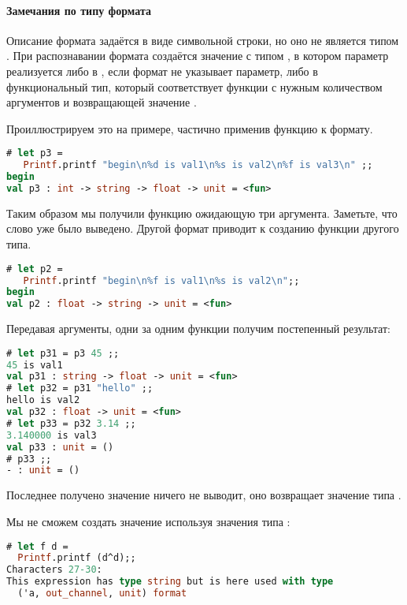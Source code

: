 \paragraph{Замечания по типу формата}

Описание формата задаётся в виде символьной строки, но оно не является типом 
. При распознавании формата создаётся значение с типом 
, в котором параметр  реализуется либо в , 
если формат не указывает параметр, либо в функциональный тип, который 
соответствует функции с нужным количеством аргументов и возвращающей значение 
.

Проиллюстрируем это на примере, частично применив функцию к формату.

\begin{lstlisting}[language=OCaml]
# let p3 = 
   Printf.printf "begin\n%d is val1\n%s is val2\n%f is val3\n" ;;
begin
val p3 : int -> string -> float -> unit = <fun>
\end{lstlisting}

Таким образом мы получили функцию ожидающую три аргумента. Заметьте, что слово 
 уже было выведено. Другой формат приводит к созданию функции 
другого типа.

\begin{lstlisting}[language=OCaml]
# let p2 = 
   Printf.printf "begin\n%f is val1\n%s is val2\n";;
begin
val p2 : float -> string -> unit = <fun>
\end{lstlisting}

Передавая аргументы, одни за одним функции  получим постепенный 
результат:

\begin{lstlisting}[language=OCaml]
# let p31 = p3 45 ;;
45 is val1
val p31 : string -> float -> unit = <fun>
# let p32 = p31 "hello" ;;
hello is val2
val p32 : float -> unit = <fun>
# let p33 = p32 3.14 ;;
3.140000 is val3
val p33 : unit = ()
# p33 ;;
- : unit = ()
\end{lstlisting}

Последнее получено значение ничего не выводит, оно возвращает значение
\code{()} типа .

Мы не сможем создать значение  используя значения типа
:

\begin{lstlisting}[language=OCaml]
# let f d =
  Printf.printf (d^d);;
Characters 27-30:
This expression has type string but is here used with type
  ('a, out_channel, unit) format
\end{lstlisting}

